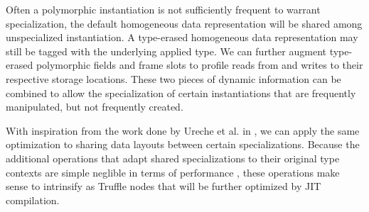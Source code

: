 Often a polymorphic instantiation is not sufficiently frequent to warrant specialization, the default homogeneous data representation will be shared among unspecialized instantiation.
A type-erased homogeneous data representation may still be tagged with the underlying applied type.
We can further augment type-erased polymorphic fields and frame slots to profile reads from and writes to their respective storage locations.
These two pieces of dynamic information can be combined to allow the specialization of certain instantiations that are frequently manipulated, but not frequently created.

With inspiration from the work done by Ureche et al. in \cite{scala:miniboxing}, we can apply the same optimization to sharing data layouts between certain specializations.
Because the additional operations that adapt shared specializations to their original type contexts are simple neglible in terms of performance \cite{scala:miniboxing}, these operations make sense to intrinsify as Truffle nodes that will be further optimized by JIT compilation.